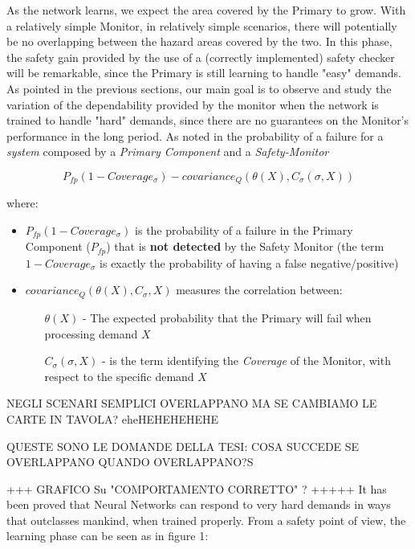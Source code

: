 As the network learns, we expect the area covered by the Primary to grow. With a relatively simple Monitor, in relatively simple scenarios, there will potentially be no overlapping between the hazard areas covered by the two. In this phase, the safety gain provided by the use of a (correctly implemented) safety checker will be remarkable, since the Primary is still learning to handle "easy" demands. As pointed in the previous sections, our main goal is to observe and study the variation of the dependability provided by the monitor when the network is trained to handle "hard" demands, since there are no guarantees on the Monitor's performance in the long period.\newline
As noted in \cite{striginiPopov} the probability of a failure for a \textsl{system} composed by a \textsl{Primary Component} and a \textsl{Safety-Monitor} 

\begin{equation}
	P_{fp} (1 - Coverage_{\sigma}) - covariance_{Q} (\theta (X), C_{\sigma} (\sigma , X))
\end{equation}

where:

\begin{itemize}
	\item $P_{fp} (1 - Coverage_{\sigma})$ is the probability of a failure in the Primary Component ($P_{fp}$) that is \textbf{not detected} by the Safety Monitor (the term $1 - Coverage_{\sigma}$ is exactly the probability of having a false negative/positive)
	\item $covariance_{Q} (\theta (X), C_{\sigma}, X)$ measures the correlation between:
	\begin{itemize}
		\item[$\theta (X)$ -] The expected probability that the Primary will fail when processing demand $X$
		\item[$C_{\sigma} (\sigma, X)$ -] is the term identifying the \textsl{Coverage} of the Monitor, with respect to the specific demand $X$
	\end{itemize}
\end{itemize}

NEGLI SCENARI SEMPLICI OVERLAPPANO MA SE CAMBIAMO LE CARTE IN TAVOLA? eheHEHEHEHEHE

QUESTE SONO LE DOMANDE DELLA TESI: COSA SUCCEDE SE OVERLAPPANO QUANDO OVERLAPPANO?S



+++ GRAFICO Su "COMPORTAMENTO CORRETTO" ? +++++\newline
It has been proved that Neural Networks can respond to very hard demands in ways that outclasses mankind, when trained properly. From a safety point of view, the learning phase can be seen as in figure 1:\newline

